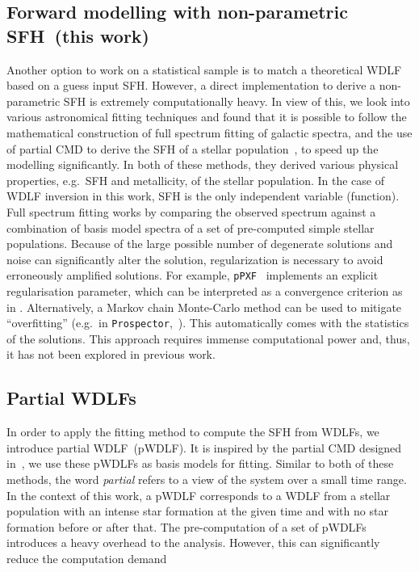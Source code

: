 \documentclass[fleqn,usenatbib]{mnras}
\begin{document}
\subsection{Forward modelling with non-parametric SFH~(this work)}
Another option to work on a statistical sample is to match a theoretical
WDLF based on a guess input SFH. However, a direct implementation to derive a
non-parametric SFH is extremely computationally heavy. In view of this, we look
into various astronomical fitting techniques and found that it is possible to
follow the mathematical construction of full spectrum fitting of galactic
spectra, and the use of partial CMD to derive the SFH of a stellar
population~\citep{2006A&A...459..783C}, to speed up the modelling significantly.
In both of these methods, they derived various physical properties, e.g.\ SFH and
metallicity, of the stellar population. In the case of WDLF inversion in this
work, SFH is the only independent variable (function). Full spectrum fitting
works by comparing the observed spectrum against a combination of basis model 
spectra of a set of pre-computed simple stellar populations. Because of the
large possible number of degenerate solutions and noise can significantly alter
the solution, regularization is necessary to avoid erroneously amplified
solutions. For example, \texttt{pPXF}~\citep{2023MNRAS.526.3273C} implements an 
explicit regularisation parameter, which can be interpreted as a convergence 
criterion as in  \citet{2013MNRAS.434.1549R}. Alternatively, a Markov chain
Monte-Carlo method can be used to mitigate ``overfitting'' (e.g.\ in 
\texttt{Prospector},~\citealp{2021ApJS..254...22J}). This automatically comes with
the statistics of the solutions. This approach requires immense computational
power and, thus, it has not been explored in previous work.

\subsection*{Partial WDLFs}
In order to apply the fitting method to compute the SFH from WDLFs, we introduce
partial WDLF~(pWDLF). It is inspired by the partial CMD designed
in~\citep{2006A&A...459..783C}, we use these pWDLFs as basis models
for fitting. Similar to both of these methods, the word \textit{partial} 
refers to a view of the system over a small time range. In the context of this
work, a pWDLF corresponds to a WDLF from a stellar population with an intense
star formation at the given time and with no star formation before or after
that. The pre-computation of a set of pWDLFs introduces a heavy overhead to the
analysis. However, this can significantly reduce the computation demand 
\end{document}
